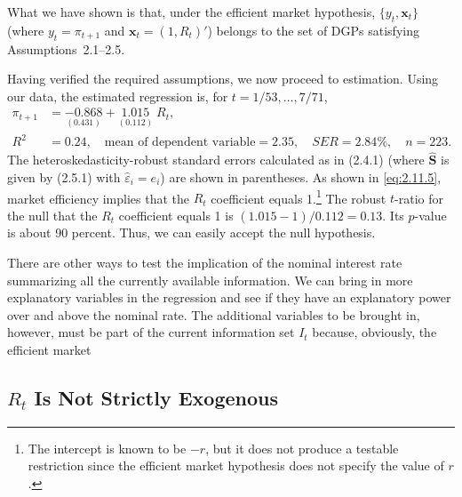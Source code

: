 What we have shown is that, under the efficient market hypothesis, $\{y_t, \mathbf{x}_t\}$
(where $y_t = \pi_{t+1}$ and $\mathbf{x}_t = (1, R_t)'$) belongs to the set of DGPs satisfying
Assumptions~2.1--2.5.

Having verified the required assumptions, we now proceed to estimation. Using
our data, the estimated regression is, for $t = 1/53, \ldots, 7/71$,
%
\begin{equation}
\begin{aligned}
\pi_{t+1} &= \underset{(0.431)}{-0.868} + \underset{(0.112)}{1.015}\; R_t, \\[4pt]
R^2 &= 0.24, \quad
\text{mean of dependent variable} = 2.35, \quad
\mathit{SER} = 2.84\%, \quad
n = 223.
\end{aligned}
\label{eq:2.11.9}
\end{equation}
%
The heteroskedasticity-robust standard errors calculated as in (2.4.1) (where
$\widehat{\mathbf{S}}$ is given by (2.5.1) with $\hat{\varepsilon}_i = e_i$) are shown in parentheses.
As shown in \eqref{eq:2.11.5}, market efficiency implies that the $R_t$ coefficient equals
1.\footnote{The intercept is known to be $-r$, but it does not produce a testable restriction
since the efficient market hypothesis does not specify the value of $r$.}
The robust $t$-ratio for the null that the $R_t$ coefficient equals 1 is
$(1.015 - 1)/0.112 = 0.13$. Its $p$-value is about 90 percent. Thus, we can easily
accept the null hypothesis.

There are other ways to test the implication of the nominal interest rate summarizing all the currently available information. We can bring in more explanatory
variables in the regression and see if they have an explanatory power over and
above the nominal rate. The additional variables to be brought in, however, must
be part of the current information set $I_t$ because, obviously, the efficient market

\subsection*{$R_t$ Is Not Strictly Exogenous}

